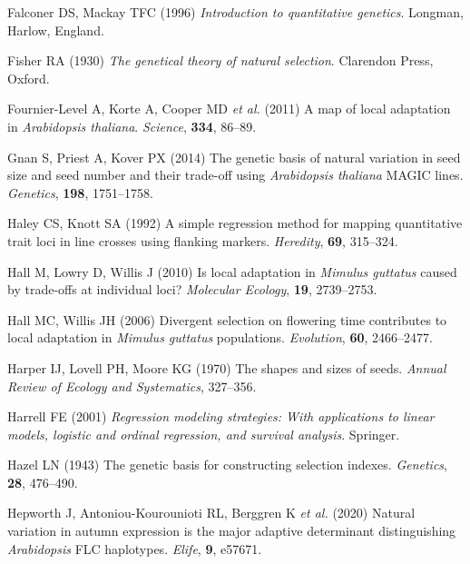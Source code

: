 \documentclass[]{article}
\begin{document}
\leavevmode\hypertarget{ref-Falconer1996}{}%
Falconer DS, Mackay TFC (1996) \emph{Introduction to quantitative genetics}. Longman, Harlow, England.

\leavevmode\hypertarget{ref-Fisher1930}{}%
Fisher RA (1930) \emph{The genetical theory of natural selection}. Clarendon Press, Oxford.

\leavevmode\hypertarget{ref-fournier2011map}{}%
Fournier-Level A, Korte A, Cooper MD \emph{et al.} (2011) A map of local adaptation in \emph{Arabidopsis thaliana}. \emph{Science}, \textbf{334}, 86--89.

\leavevmode\hypertarget{ref-gnan2014genetic}{}%
Gnan S, Priest A, Kover PX (2014) The genetic basis of natural variation in seed size and seed number and their trade-off using \emph{Arabidopsis thaliana} MAGIC lines. \emph{Genetics}, \textbf{198}, 1751--1758.

\leavevmode\hypertarget{ref-Haley1992}{}%
Haley CS, Knott SA (1992) A simple regression method for mapping quantitative trait loci in line crosses using flanking markers. \emph{Heredity}, \textbf{69}, 315--324.

\leavevmode\hypertarget{ref-Hall2010}{}%
Hall M, Lowry D, Willis J (2010) Is local adaptation in \emph{Mimulus guttatus} caused by trade-offs at individual loci? \emph{Molecular Ecology}, \textbf{19}, 2739--2753.

\leavevmode\hypertarget{ref-Hall2006}{}%
Hall MC, Willis JH (2006) Divergent selection on flowering time contributes to local adaptation in \emph{Mimulus guttatus} populations. \emph{Evolution}, \textbf{60}, 2466--2477.

\leavevmode\hypertarget{ref-Harper1970}{}%
Harper IJ, Lovell PH, Moore KG (1970) The shapes and sizes of seeds. \emph{Annual Review of Ecology and Systematics}, 327--356.

\leavevmode\hypertarget{ref-harrell2001regression}{}%
Harrell FE (2001) \emph{Regression modeling strategies: With applications to linear models, logistic and ordinal regression, and survival analysis}. Springer.

\leavevmode\hypertarget{ref-Hazel1943}{}%
Hazel LN (1943) The genetic basis for constructing selection indexes. \emph{Genetics}, \textbf{28}, 476--490.

\leavevmode\hypertarget{ref-hepworth2020natural}{}%
Hepworth J, Antoniou-Kourounioti RL, Berggren K \emph{et al.} (2020) Natural variation in autumn expression is the major adaptive determinant distinguishing \emph{Arabidopsis} FLC haplotypes. \emph{Elife}, \textbf{9}, e57671.
\end{document}

